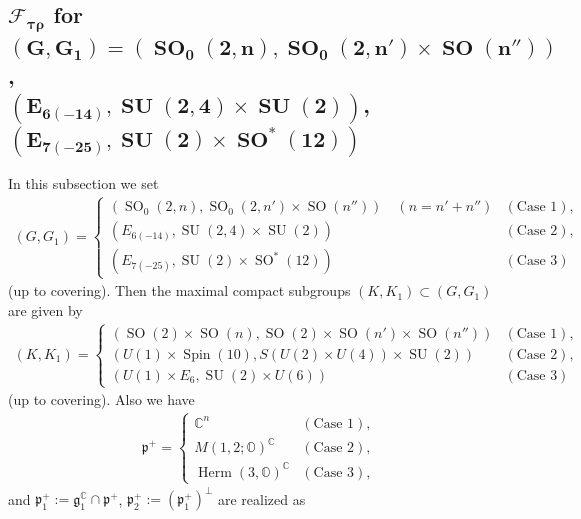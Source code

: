 \documentclass[pdftex]{sigma}
\numberwithin{equation}{section}
\newcommand{\BC}{\mathbb{C}}
\newcommand{\BO}{\mathbb{O}}
\newcommand{\fg}{\mathfrak{g}}
\newcommand{\fp}{\mathfrak{p}}
\newcommand{\cF}{\mathcal{F}}
\newcommand{\Herm}{\operatorname{Herm}}
\begin{document}
\subsection[$\cF_{\tau\rho}$ for $(G,G_1)=(\operatorname{SO}_0(2,n), \operatorname{SO}_0(2,n')\times \operatorname{SO}(n''))$, \\
$(E_{6(-14)}, \operatorname{SU}(2,4)\times \operatorname{SU}(2))$, $(E_{7(-25)}, \operatorname{SU}(2)\times \operatorname{SO}^*(12))$]{$\boldsymbol{\cF_{\tau\rho}}$ for $\boldsymbol{(G,G_1)=(\operatorname{SO}_0(2,n), \operatorname{SO}_0(2,n')\times \operatorname{SO}(n''))}$, \\
$\boldsymbol{(E_{6(-14)}, \operatorname{SU}(2,4)\times \operatorname{SU}(2))}$, $\boldsymbol{(E_{7(-25)}, \operatorname{SU}(2)\times \operatorname{SO}^*(12))}$}
In this subsection we set
\begin{gather*} (G,G_1)= \begin{cases}(\operatorname{SO}_0(2,n), \operatorname{SO}_0(2,n')\times \operatorname{SO}(n'')) \quad (n=n'+n'')& (\text{Case }1), \\
(E_{6(-14)}, \operatorname{SU}(2,4)\times \operatorname{SU}(2)) & (\text{Case }2), \\
(E_{7(-25)}, \operatorname{SU}(2)\times \operatorname{SO}^*(12)) & (\text{Case }3) \end{cases} \end{gather*}
(up to covering). Then the maximal compact subgroups $(K,K_1)\subset (G,G_1)$ are given by
\begin{gather*}
(K,K_1)=\begin{cases} (\operatorname{SO}(2)\times \operatorname{SO}(n), \operatorname{SO}(2)\times \operatorname{SO}(n')\times \operatorname{SO}(n''))& (\text{Case }1),\\
(U(1)\times \operatorname{Spin}(10), S(U(2)\times U(4))\times \operatorname{SU}(2))& (\text{Case }2),\\
(U(1)\times E_6,\operatorname{SU}(2)\times U(6))& (\text{Case }3) \end{cases}
\end{gather*}
(up to covering). Also we have
\begin{gather*} \fp^+=\begin{cases}\BC^n & (\text{Case }1),\\ M(1,2;\BO)^\BC & (\text{Case }2),\\ \Herm(3,\BO)^\BC & (\text{Case }3), \end{cases} \end{gather*}
and $\fp^+_1:=\fg_1^\BC\cap\fp^+$, $\fp^+_2:=(\fp^+_1)^\bot$ are realized as
\end{document}
